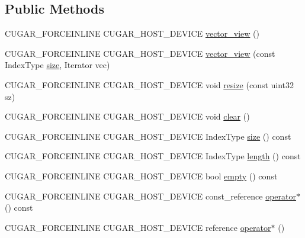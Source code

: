 \subsection*{Public Methods}
\begin{DoxyCompactItemize}
\item 
C\+U\+G\+A\+R\+\_\+\+F\+O\+R\+C\+E\+I\+N\+L\+I\+NE C\+U\+G\+A\+R\+\_\+\+H\+O\+S\+T\+\_\+\+D\+E\+V\+I\+CE \hyperlink{structcugar_1_1vector__view_af85824a098e4639d61a92e8fedd18eeb}{vector\+\_\+view} ()
\item 
C\+U\+G\+A\+R\+\_\+\+F\+O\+R\+C\+E\+I\+N\+L\+I\+NE C\+U\+G\+A\+R\+\_\+\+H\+O\+S\+T\+\_\+\+D\+E\+V\+I\+CE \hyperlink{structcugar_1_1vector__view_a3be7d304f396892386ca3490f81eeee1}{vector\+\_\+view} (const Index\+Type \hyperlink{structcugar_1_1vector__view_a773841d0e535b07e40a99891e22d937e}{size}, Iterator vec)
\item 
C\+U\+G\+A\+R\+\_\+\+F\+O\+R\+C\+E\+I\+N\+L\+I\+NE C\+U\+G\+A\+R\+\_\+\+H\+O\+S\+T\+\_\+\+D\+E\+V\+I\+CE void \hyperlink{structcugar_1_1vector__view_a7335a6a0571dd33619f292e79b90854d}{resize} (const uint32 sz)
\item 
C\+U\+G\+A\+R\+\_\+\+F\+O\+R\+C\+E\+I\+N\+L\+I\+NE C\+U\+G\+A\+R\+\_\+\+H\+O\+S\+T\+\_\+\+D\+E\+V\+I\+CE void \hyperlink{structcugar_1_1vector__view_a46b9be216230954a48e42cda236d7fcd}{clear} ()
\item 
C\+U\+G\+A\+R\+\_\+\+F\+O\+R\+C\+E\+I\+N\+L\+I\+NE C\+U\+G\+A\+R\+\_\+\+H\+O\+S\+T\+\_\+\+D\+E\+V\+I\+CE Index\+Type \hyperlink{structcugar_1_1vector__view_a773841d0e535b07e40a99891e22d937e}{size} () const
\item 
C\+U\+G\+A\+R\+\_\+\+F\+O\+R\+C\+E\+I\+N\+L\+I\+NE C\+U\+G\+A\+R\+\_\+\+H\+O\+S\+T\+\_\+\+D\+E\+V\+I\+CE Index\+Type \hyperlink{structcugar_1_1vector__view_a601703688bdebd25c563c95ecea1cf43}{length} () const
\item 
C\+U\+G\+A\+R\+\_\+\+F\+O\+R\+C\+E\+I\+N\+L\+I\+NE C\+U\+G\+A\+R\+\_\+\+H\+O\+S\+T\+\_\+\+D\+E\+V\+I\+CE bool \hyperlink{structcugar_1_1vector__view_ac375abedf354fd94d74cf897ce63568f}{empty} () const
\item 
C\+U\+G\+A\+R\+\_\+\+F\+O\+R\+C\+E\+I\+N\+L\+I\+NE C\+U\+G\+A\+R\+\_\+\+H\+O\+S\+T\+\_\+\+D\+E\+V\+I\+CE const\+\_\+reference \hyperlink{structcugar_1_1vector__view_a446be6811de588c4ab935cf3b85b81d2}{operator$\ast$} () const
\item 
C\+U\+G\+A\+R\+\_\+\+F\+O\+R\+C\+E\+I\+N\+L\+I\+NE C\+U\+G\+A\+R\+\_\+\+H\+O\+S\+T\+\_\+\+D\+E\+V\+I\+CE reference \hyperlink{structcugar_1_1vector__view_a355007914d4ca4e66cdca7a16c90bf0f}{operator$\ast$} ()

\end{DoxyCompactItemize}
